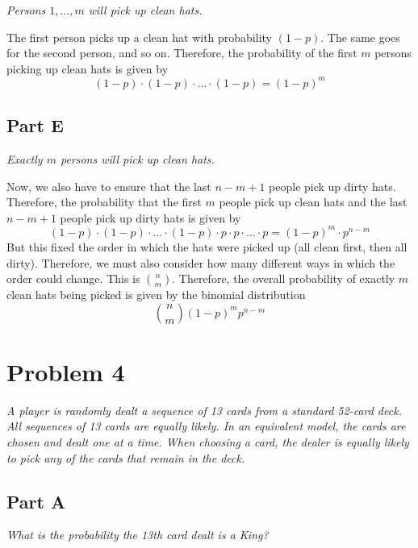\documentclass{article}
\begin{document}
\textit{Persons $ 1, \ldots, m $ will pick up clean hats.}

\bigbreak

The first person picks up a clean hat with probability $ (1 - p) $. The same
goes for the second person, and so on. Therefore, the probability of the
first $ m $ persons picking up clean hats is given by
$$ (1 - p) \cdot (1 - p) \cdot \ldots \cdot (1 - p) = (1 - p)^m $$

\subsection*{Part E}

\textit{Exactly $ m $ persons will pick up clean hats.}

\bigbreak

Now, we also have to ensure that the last $ n - m + 1 $ people pick up dirty
hats. Therefore, the probability that the first $ m $ people pick up clean
hats and the last $ n - m + 1 $ people pick up dirty hats is given by
$$ (1 - p) \cdot (1 - p) \cdot \ldots \cdot (1 - p) \cdot p \cdot p \cdot
\ldots \cdot p = (1 - p)^m \cdot p^{n - m} $$
But this fixed the order in which the hats were picked up (all clean first,
then all dirty). Therefore, we must also consider how many different ways
in which the order could change. This is $ \binom{n}{m} $. Therefore, the
overall probability of exactly $ m $ clean hats being picked is given by
the binomial distribution
$$ \binom{n}{m} (1 - p)^m p^{n - m} $$

\section*{Problem 4}

\textit{A player is randomly dealt a sequence of 13 cards from a standard
52-card deck. All sequences of 13 cards are equally likely. In an equivalent
model, the cards are chosen and dealt one at a time. When choosing a card,
the dealer is equally likely to pick any of the cards that remain in the
deck.}

\subsection*{Part A}

\textit{What is the probability the 13th card dealt is a King?}

\bigbreak
\end{document}
